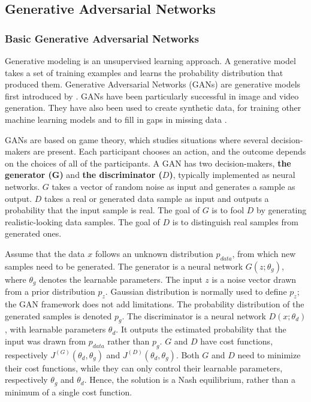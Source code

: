 \subsection{Generative Adversarial Networks}

\subsubsection{Basic Generative Adversarial Networks}
Generative modeling is an unsupervised learning approach. A generative model takes a set of training examples and learns the probability distribution that produced them. Generative Adversarial Networks (GANs) are generative models first introduced by \textcite{goodfellowGenerativeAdversarialNetworks2014}.
GANs have been particularly successful in image and video generation. They have also been used to create synthetic data, for training other machine learning models and to fill in gaps in missing data \parencite{goodfellowGenerativeAdversarialNetworks2020}.

GANs are based on game theory, which studies situations where several decision-makers are present. Each participant chooses an action, and the outcome depends on the choices of all of the participants. A GAN has two decision-makers, \textbf{the generator (G)} and \textbf{the discriminator ($D$)}, typically implemented as neural networks. $G$ takes a vector of random noise as input and generates a sample as output. $D$ takes a real or generated data sample as input and outputs a probability that the input sample is real. The goal of $G$ is to fool $D$ by generating realistic-looking data samples. The goal of $D$ is to distinguish real samples from generated ones.

Assume that the data $x$ follows an unknown distribution $p_{data}$, from which new samples need to be generated. The generator is a neural network $G(z; \theta_g)$, where $\theta_g$ denotes the learnable parameters. The input $z$ is a noise vector drawn from a prior distribution $p_z$. Gaussian distribution is normally used to define $p_z$; the GAN framework does not add limitations. The probability distribution of the generated samples is denoted $p_g$. The discriminator is a neural network $D(x; \theta_d)$, with learnable parameters $\theta_d$. It outputs the estimated probability that the input was drawn from  $p_{data}$ rather than $p_{g}$. $G$ and $D$ have cost functions, respectively $J^{(G)}(\theta_d, \theta_g)$ and $J^{(D)}(\theta_d, \theta_g)$. Both $G$ and $D$ need to minimize their cost functions, while they can only control their learnable parameters, respectively $\theta_g$ and $\theta_d$. Hence, the solution is a Nash equilibrium, rather than a minimum of a single cost function.

